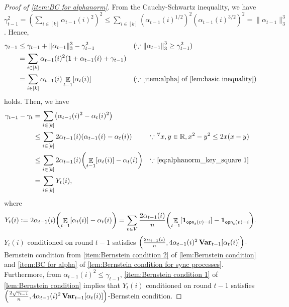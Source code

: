 \documentclass[letterpaper,11pt]{article}
\def\defeq{\mathrel{\mathop:}=}
\DeclarePairedDelimiter{\rbra}{\lparen}{\rparen} %
\DeclarePairedDelimiter{\sbra}{\lbrack}{\rbrack} %
\newcommand{\indicator}{\mathbf{1}}
\DeclareMathOperator*{\E}{\mathbb{E}}
\DeclareMathOperator*{\Var}{\mathbf{Var}}
\newcommand{\Nat}{\mathbb{N}}
\newcommand{\Real}{\mathbb{R}}
\newcommand{\alphanorm}{\gamma}
\newcommand{\opinion}{\mathsf{opn}}
\newcommand{\tinyforall}{{}^{\forall}}
\begin{document}
  \begin{proof}[Proof of \cref{item:BC for alphanorm}]
    From the Cauchy-Schwartz inequality, we have
    $\alphanorm_{t-1}^2=\left(\sum_{i\in [k]}\alpha_{t-1}(i)^2\right)^2\leq \sum_{i\in [k]}(\alpha_{t-1}(i)^{1/2})^2(\alpha_{t-1}(i)^{3/2})^2=\|\alpha_{t-1}\|_3^3$.
    Hence, 
    \begin{align}
        \alphanorm_{t-1}
        &\leq \alphanorm_{t-1}+\|\alpha_{t-1}\|_3^3-\alphanorm_{t-1}^2 & & (\text{$\because$ $\norm{\alpha_{t-1}}_3^3\geq \alphanorm_{t-1}^2$}) \nonumber \\
        &=\sum_{i\in [k]}\alpha_{t-1}(i)^2\qty(1+\alpha_{t-1}(i)+\alphanorm_{t-1}) \nonumber \\
        &=\sum_{i\in [k]}\alpha_{t-1}(i)\E_{t-1}[\alpha_t(i)] & & (\text{$\because$ \cref{item:alpha} of \cref{lem:basic inequality}})
        \label{eq:alphanorm_key_square 1}
    \end{align}
    holds.
    Then, we have
    \begin{align}
      \alphanorm_{t-1}-\alphanorm_t
        &=\sum_{i\in [k]}\rbra*{\alpha_{t-1}(i)^2-\alpha_{t}(i)^2} \nonumber\\
        &\leq \sum_{i\in [k]}2\alpha_{t-1}(i)\rbra*{\alpha_{t-1}(i)-\alpha_{t}(i)} & & \text{$\because$ $\tinyforall x,y\in\Real, x^2-y^2\le 2x(x-y)$}\nonumber\\
        &\leq \sum_{i\in [k]}2\alpha_{t-1}(i)\rbra*{\E_{t-1}\sbra*{\alpha_{t}(i)}-\alpha_{t}(i)} & & \text{$\because$ \cref{eq:alphanorm_key_square 1}}\nonumber\\
        &=\sum_{i\in [k]}Y_t(i), \nonumber %
    \end{align}
    where \[
    Y_t(i)\defeq 2\alpha_{t-1}(i)\rbra*{\E_{t-1}\sbra*{\alpha_{t}(i)}-\alpha_{t}(i)}=\sum_{v\in V}\frac{2\alpha_{t-1}(i)}{n}\qty(\E_{t-1}[\indicator_{\opinion_t(v)=i}]-\indicator_{\opinion_t(v)=i}).
    \]
    $Y_t(i)$ conditioned on round $t-1$ satisfies $\qty(\frac{2\alpha_{t-1}(i)}{n},4\alpha_{t-1}(i)^2\Var_{t-1}[\alpha_t(i)])$-Bernstein condition from \cref{item:Bernstein condition 2} of \cref{lem:Bernstein condition} and \cref{item:BC for alpha} of \cref{lem:Bernstein condition for sync processes}.
    Furthermore, from $\alpha_{t-1}(i)^2\leq \alphanorm_{t-1}$, \cref{item:Bernstein condition 1} of \cref{lem:Bernstein condition} implies that 
    $Y_t(i)$ conditioned on round $t-1$ satisfies $\qty(\frac{2\sqrt{\alphanorm_{t-1}}}{n},4\alpha_{t-1}(i)^2\Var_{t-1}[\alpha_t(i)])$-Bernstein condition.
    

\end{proof}
\end{document}
